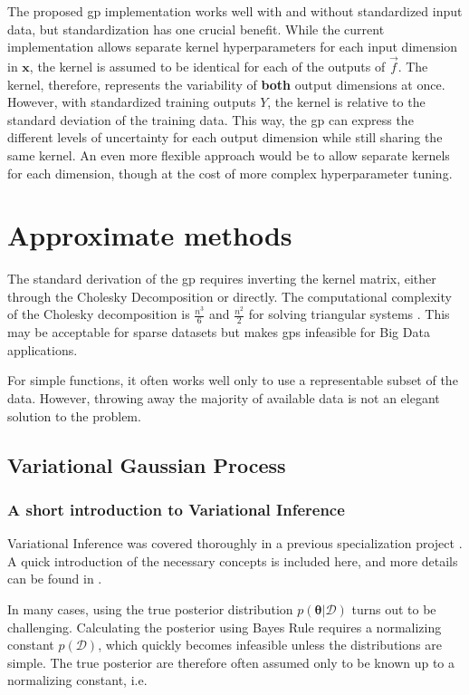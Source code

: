 The proposed \acrshort{gp} implementation works well with and without standardized input data, but standardization has one crucial benefit. While the current implementation allows separate kernel hyperparameters for each input dimension in $\boldsymbol{x}$, the kernel is assumed to be identical for each of the outputs of $\vec{f}$. The kernel, therefore, represents the variability of \textbf{both} output dimensions at once. However, with standardized training outputs $Y$, the kernel is relative to the standard deviation of the training data. This way, the \acrshort{gp} can express the different levels of uncertainty for each output dimension while still sharing the same kernel. An even more flexible approach would be to allow separate kernels for each dimension, though at the cost of more complex hyperparameter tuning.

\section{Approximate methods}
The standard derivation of the \acrshort{gp} requires inverting the kernel matrix, either through the Cholesky Decomposition or directly. The computational complexity of the Cholesky decomposition is $\frac{n^3}{6}$ and $\frac{n^2}{2}$ for solving triangular systems \cite{rasmussen}. This may be acceptable for sparse datasets but makes \acrshort{gp}s infeasible for Big Data applications. 

For simple functions, it often works well only to use a representable subset of the data. However, throwing away the majority of available data is not an elegant solution to the problem. 
\subsection{Variational Gaussian Process}

\subsubsection{A short introduction to Variational Inference}
Variational Inference was covered thoroughly in a previous specialization project \cite{mellbye}. A quick introduction of the necessary concepts is included here, and more details can be found in \cite{mellbye, murphy}.

In many cases, using the true posterior distribution $p(\boldsymbol{\theta} | \mathcal{D})$ turns out to be challenging. Calculating the posterior using Bayes Rule requires a normalizing constant $p(\mathcal{D})$, which quickly becomes infeasible unless the distributions are simple. The true posterior are therefore often assumed only to be known up to a normalizing constant, i.e.

